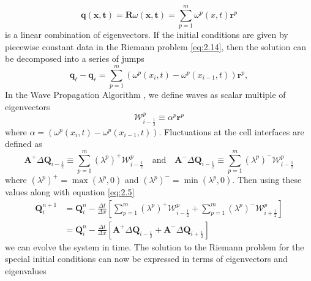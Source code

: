 \documentclass[twoside]{bsu-ms}
\begin{document}
\begin{equation}\label{eq:2.16}
\mathbf{q}(\mathbf{x},\mathbf{t}) = \mathbf{R}\omega(\mathbf{x},\mathbf{t}) = \sum_{p=1}^{m} \omega^p(x,t)\mathbf{r}^p
\end{equation}
is a linear combination of eigenvectors. 
If the initial conditions are given by piecewise constant data in the Riemann problem \eqref{eq:2.14}, then the solution can be decomposed into a series of jumps
\begin{equation}\label{eq:2.17}
    \mathbf{q}_{\ell}-\mathbf{q}_{r}=\sum_{p=1}^{m}\left(\omega^{p}(x_{i},t)-\omega^{p}(x_{i-1},t)\right)\mathbf{r}^{p},
\end{equation}
In the Wave Propagation Algorithm \cite{leveque2002finite}, we define waves as scalar multiple of eigenvectors 
\begin{equation}\label{eq:2.18}
    \mathbf{\mathcal{W}}_{i-\frac{1}{2}}^{p}\equiv\alpha^{p}\mathbf{r}^{p}
\end{equation}
where $\alpha = \left(\omega^{p}(x_{i},t)-\omega^{p}(x_{i-1},t)\right)$.
Fluctuations at the cell interfaces are defined as
\begin{equation}\label{eq:2.19}
    \mathbf{A}^{+}\Delta \mathbf{Q}_{i-\frac{1}{2}} \equiv \sum_{p=1}^{m}\left(\lambda^{p}\right)^{+}\mathbf{\mathcal{W}}_{i-\frac{1}{2}}^{p}\quad\text{and}\quad \mathbf{A}^{-}\Delta \mathbf{Q}_{i-\frac{1}{2}} \equiv \sum_{p=1}^{m}\left(\lambda^{p}\right)^{-}\mathbf{\mathcal{W}}_{i-\frac{1}{2}}^{p}
\end{equation}
where $\left(\lambda^{p}\right)^{+}=\max\left(\lambda^p,0\right)$ and  $\left(\lambda^{p}\right)^{-}=\min\left(\lambda^p,0\right)$. Then using these values along with equation \eqref{eq:2.5}
\begin{equation}\label{eq:2.20}
    \begin{split}
    \mathbf{Q}_{i}^{n+1}&=\mathbf{Q}_{i}^{n}-\frac{\Delta t}{\Delta x}\left[\sum_{p=1}^{m}\left(\lambda^{p}\right)^{+}\mathbf{\mathcal{W}}_{i-\frac{1}{2}}^{p}+\sum_{p=1}^{m}\left(\lambda^{p}\right)^{-}\mathbf{\mathcal{W}}_{i+\frac{1}{2}}^{p}\right]\\
    &=\mathbf{Q}_{i}^{n}-\frac{\Delta t}{\Delta x}\left[\mathbf{A}^{+}\Delta \mathbf{Q}_{i-\frac{1}{2}}+\mathbf{A}^{-}\Delta \mathbf{Q}_{i+\frac{1}{2}}\right]
    \end{split}
\end{equation} 
we can evolve the system in time. The solution to the Riemann problem for the special initial conditions can now be expressed in terms of eigenvectors and eigenvalues
\end{document}
